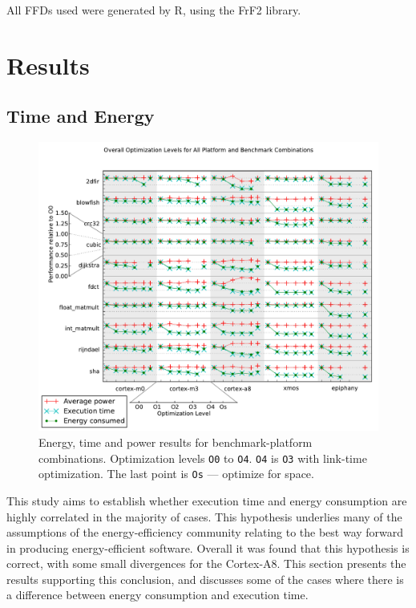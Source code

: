\documentclass[twocolumn]{article}
\let\oldcaption\caption
\renewcommand{\caption}[1]{\oldcaption{\textup{#1}}}
\begin{document}
All FFDs used were generated by R\cite{R}, using the FrF2 library\cite{FrF2}.

\section{Results}

\subsection*{Time and Energy}


\begin{figure}[tb!]
	\centering
	\includegraphics[width=\textwidth,clip, trim=0cm 0cm 0 2.1cm]{levels.pdf}
	\caption{Energy, time and power results for benchmark-platform combinations. Optimization levels \texttt{O0} to \texttt{O4}. \texttt{O4} is \texttt{O3} with link-time optimization. The last point is \texttt{Os} --- optimize for space. }
	\label{Fig:OverallView}
\end{figure}
This study aims to establish whether execution time and energy consumption are highly correlated in the majority of cases. This hypothesis underlies many of the assumptions of the energy-efficiency community relating to the best way forward in producing energy-efficient software. Overall it was found that this hypothesis is correct, with some small divergences for the Cortex-A8. This section presents the results supporting this conclusion, and discusses some of the cases where there is a difference between energy consumption and execution time.
\end{document}
